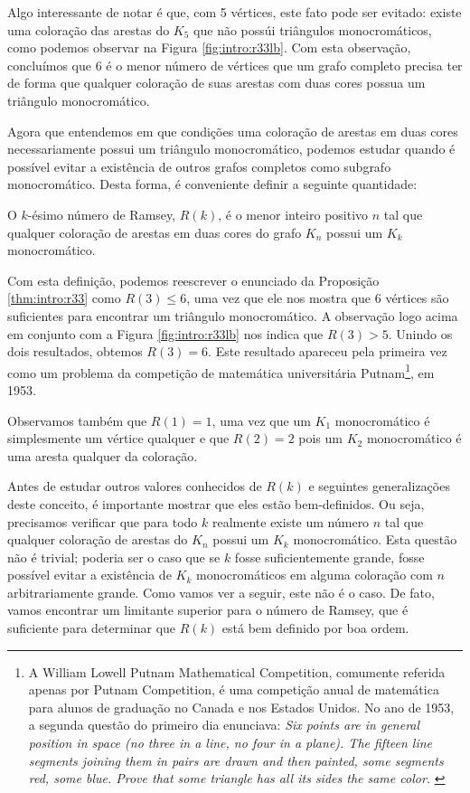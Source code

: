 Algo interessante de notar é que, com 5 vértices, este fato pode ser evitado: existe uma coloração das arestas do $K_5$ que não possúi triângulos monocromáticos, como podemos observar na Figura \ref{fig:intro:r33lb}. Com esta observação, concluímos que 6 é o menor número de vértices que um grafo completo precisa ter de forma que qualquer coloração de suas arestas com duas cores possua um triângulo monocromático.

Agora que entendemos em que condições uma coloração de arestas em duas cores necessariamente possui um triângulo monocromático, podemos estudar quando é possível evitar a existência de outros grafos completos como subgrafo monocromático. Desta forma, é conveniente definir a seguinte quantidade:

\begin{definition}
O $k$-ésimo número de Ramsey, $R(k)$, é o menor inteiro positivo $n$ tal que qualquer coloração de arestas em duas cores do grafo $K_n$ possui um $K_k$ monocromático.
\end{definition}

Com esta definição, podemos reescrever o enunciado da Proposição \ref{thm:intro:r33} como $R(3) \leq 6$, uma vez que ele nos mostra que 6 vértices são suficientes para encontrar um triângulo monocromático. A observação logo acima em conjunto com a Figura \ref{fig:intro:r33lb} nos indica que $R(3) > 5$. Unindo os dois resultados, obtemos $R(3) = 6$. Este resultado apareceu pela primeira vez como um problema da competição de matemática universitária Putnam\footnote{A William Lowell Putnam Mathematical Competition, comumente referida apenas por Putnam Competition, é uma competição anual de matemática para alunos de graduação no Canada e nos Estados Unidos. No ano de 1953, a segunda questão do primeiro dia enunciava:
\emph{Six points are in general position in space (no three in a line, no four in a plane). The fifteen line segments joining them in pairs are drawn and then painted, some segments red, some blue. Prove that some triangle has all its sides the same color.} \cite{putnam}}, em 1953.

Observamos também que $R(1) = 1$, uma vez que um $K_1$ monocromático é simplesmente um vértice qualquer e que $R(2) = 2$ pois um $K_2$ monocromático é uma aresta qualquer da coloração.

Antes de estudar outros valores conhecidos de $R(k)$ e seguintes generalizações deste conceito, é importante mostrar que eles estão bem-definidos. Ou seja, precisamos verificar que para todo $k$ realmente existe um número $n$ tal que qualquer coloração de arestas do $K_n$ possui um $K_k$ monocromático. Esta questão não é trivial; poderia ser o caso que se $k$ fosse suficientemente grande, fosse possível evitar a existência de $K_k$ monocromáticos em alguma coloração com $n$ arbitrariamente grande. Como vamos ver a seguir, este não é o caso. De fato, vamos encontrar um limitante superior para o número de Ramsey, que é suficiente para determinar que $R(k)$ está bem definido por boa ordem.

